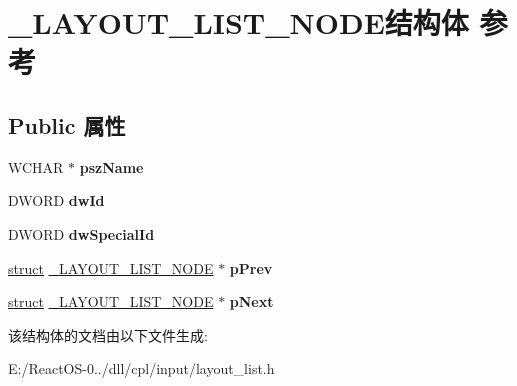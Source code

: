 \hypertarget{struct___l_a_y_o_u_t___l_i_s_t___n_o_d_e}{}\section{\+\_\+\+L\+A\+Y\+O\+U\+T\+\_\+\+L\+I\+S\+T\+\_\+\+N\+O\+D\+E结构体 参考}
\label{struct___l_a_y_o_u_t___l_i_s_t___n_o_d_e}
\subsection*{Public 属性}
\begin{DoxyCompactItemize}
\item 
\mbox{\label{struct___l_a_y_o_u_t___l_i_s_t___n_o_d_e_a47cd08af9033746937983fc11d3c4ac5}} 
W\+C\+H\+AR $\ast$ {\bfseries psz\+Name}
\item 
\mbox{\label{struct___l_a_y_o_u_t___l_i_s_t___n_o_d_e_aeb89e2879b32e288dd07a93da7ebe3f9}} 
D\+W\+O\+RD {\bfseries dw\+Id}
\item 
\mbox{\label{struct___l_a_y_o_u_t___l_i_s_t___n_o_d_e_a0c7329099cb0ac0c738ad0bd6f95cb78}} 
D\+W\+O\+RD {\bfseries dw\+Special\+Id}
\item 
\mbox{\label{struct___l_a_y_o_u_t___l_i_s_t___n_o_d_e_a63c73fe06411e729de4b36a3b439d1c4}} 
\hyperlink{interfacestruct}{struct} \hyperlink{struct___l_a_y_o_u_t___l_i_s_t___n_o_d_e}{\+\_\+\+L\+A\+Y\+O\+U\+T\+\_\+\+L\+I\+S\+T\+\_\+\+N\+O\+DE} $\ast$ {\bfseries p\+Prev}
\item 
\mbox{\label{struct___l_a_y_o_u_t___l_i_s_t___n_o_d_e_a9f69ca1d51b393a27dce23423f4c91c2}} 
\hyperlink{interfacestruct}{struct} \hyperlink{struct___l_a_y_o_u_t___l_i_s_t___n_o_d_e}{\+\_\+\+L\+A\+Y\+O\+U\+T\+\_\+\+L\+I\+S\+T\+\_\+\+N\+O\+DE} $\ast$ {\bfseries p\+Next}
\end{DoxyCompactItemize}


该结构体的文档由以下文件生成\+:\begin{DoxyCompactItemize}
\item 
E\+:/\+React\+O\+S-\/0../dll/cpl/input/layout\+\_\+list.\+h\end{DoxyCompactItemize}
